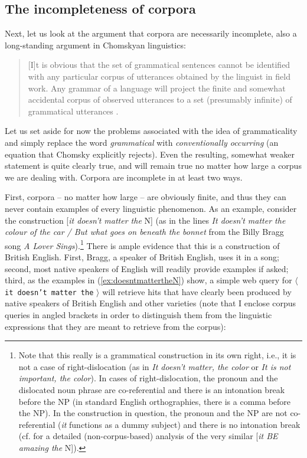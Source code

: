 \subsection{The incompleteness of corpora}
\label{sec:incompletenessofcorpora}

Next, let us look at the argument that corpora are necessarily incomplete, also a long\hyp{}standing argument in Chomskyan linguistics:

\begin{quote}
[I]t is obvious that the set of grammatical sentences cannot be identified with any particular corpus of utterances obtained by the linguist in field work. Any grammar of a language will project the finite and somewhat accidental corpus of observed utterances to a set (presumably infinite) of grammatical utterances \citep[15]{chomsky_syntactic_1957}.
\end{quote}

Let us set aside for now the problems associated with the idea of grammaticality  and simply replace the word \emph{grammatical} with \emph{conventionally occurring} (an equation that Chomsky explicitly rejects). Even the resulting, somewhat weaker statement is quite clearly true, and will remain true no matter how large  a corpus we are dealing with. Corpora are incomplete in at least two ways.

First, corpora -- no matter how large  -- are obviously finite, and thus they can never contain examples of every linguistic phenomenon. As an example, consider the construction [\textit{it doesn't matter the} N] (as in the lines \textit{It doesn't matter the colour of the car / But what goes on beneath the bonnet} from the Billy Bragg song \textit{A Lover Sings}).\footnote{Note that this really is a grammatical construction in its own right, i.e., it is not a case of right\hyp{}dislocation (as in \textit{It doesn't matter, the color} or \textit{It is not important, the color}). In cases of right\hyp{}dislocation, the pronoun  and the dislocated noun  phrase are co\hyp{}referential and there is an intonation  break before the NP (in standard English orthographies, there is a comma before the NP). In the construction in question, the pronoun and the NP are not co\hyp{}referential (\textit{it} functions as a dummy subject) and there is no intonation break (cf. \citealt{michaelis_toward_1996} for a detailed (non\hyp{}corpus\hyp{}based) analysis of the very similar [\textit{it BE amazing the} N]).} There is ample evidence that this is a construction of British  English. First, Bragg, a speaker of British English, uses it in a song; second, most native speakers of English will readily provide examples if asked; third, as the examples in (\ref{ex:doesntmattertheN}) show, a simple web query  for $\langle$ \texttt{\textquotedbl it doesn't matter the\textquotedbl} $\rangle$ will retrieve  hits  that have clearly been produced by native speakers of British English and other varieties (note that I enclose corpus queries in angled brackets in order to distinguish them from the linguistic expressions that they are meant to retrieve from the corpus):

